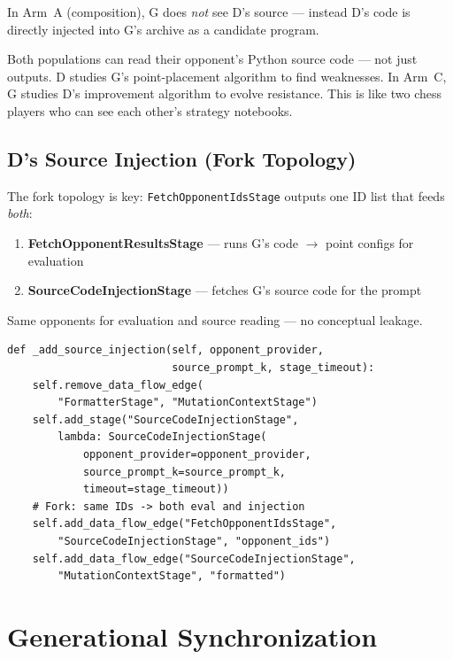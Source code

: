 \documentclass[11pt,a4paper]{article}
\begin{document}
In Arm~A (composition), G does \emph{not} see D's source --- instead D's code is directly injected into G's archive as a candidate program.

\begin{eli5box}
Both populations can read their opponent's Python source code --- not just outputs. D studies G's point-placement algorithm to find weaknesses. In Arm~C, G studies D's improvement algorithm to evolve resistance.  This is like two chess players who can see each other's strategy notebooks.
\end{eli5box}

\subsection{D's Source Injection (Fork Topology)}

The fork topology is key: \texttt{FetchOpponentIdsStage} outputs one ID list that feeds \emph{both}:
\begin{enumerate}[nosep]
  \item \textbf{FetchOpponentResultsStage} --- runs G's code $\to$ point configs for evaluation
  \item \textbf{SourceCodeInjectionStage} --- fetches G's source code for the prompt
\end{enumerate}
Same opponents for evaluation and source reading --- no conceptual leakage.

\begin{lstlisting}[caption={Fork wiring (\texttt{asymmetric\_pipeline.py:109--133})}]
def _add_source_injection(self, opponent_provider,
                          source_prompt_k, stage_timeout):
    self.remove_data_flow_edge(
        "FormatterStage", "MutationContextStage")
    self.add_stage("SourceCodeInjectionStage",
        lambda: SourceCodeInjectionStage(
            opponent_provider=opponent_provider,
            source_prompt_k=source_prompt_k,
            timeout=stage_timeout))
    # Fork: same IDs -> both eval and injection
    self.add_data_flow_edge("FetchOpponentIdsStage",
        "SourceCodeInjectionStage", "opponent_ids")
    self.add_data_flow_edge("SourceCodeInjectionStage",
        "MutationContextStage", "formatted")
\end{lstlisting}

\section{Generational Synchronization}
\end{document}
